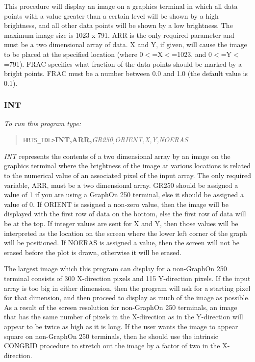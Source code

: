 This procedure will display an image on a graphics terminal in which all data
points with a value greater than a certain level will be shown by a high
brightness, and all other data points will be shown by a low brightness. The
maximum image size is 1023 x 791. ARR is the only required parameter and must
be a two dimensional array of data.  X and Y, if given, will cause the image to
be placed at the specified location (where 0$<$=X$<$=1023, and 0$<$=Y$<$=791). 
FRAC specifies what fraction of the data points should be marked by a bright
points.  FRAC must be a number between 0.0 and 1.0 (the default value is 0.1).  

\subsubsection{INT}

{\em To run this program type:}
\begin{quote}   
     {\tt HRTS\_IDL>}{\bf INT,ARR,}{\it GR250,ORIENT,X,Y,NOERAS}        
\end{quote}   

{\em INT} represents the contents of a two dimensional array by an image on the
graphics terminal where the brightness of the image at various locations is
related to the numerical value of an associated pixel of the input array.  The
only required variable, ARR, must be a two dimensional array.  GR250 should be
assigned a value of 1 if you are using a GraphOn 250 terminal, else it should
be assigned a value of 0. If ORIENT is assigned a non-zero value, then the
image will be displayed with the first row of data on the bottom, else the
first row of data will be at the top.  If integer values are sent for X and Y,
then those values will be interpreted as the location on the screen where the
lower left corner of the graph will be positioned.  If NOERAS is assigned a
value, then the screen will not be erased before the plot is drawn, otherwise
it will be erased.  

The largest image which this program can display for a non-GraphOn 250 terminal
consists of 300 X-direction pixels and 115 Y-direction pixels.  If the input
array is too big in either dimension, then the program will ask for a starting
pixel for that dimension, and then proceed to display as much of the image as
possible.  As a result of the screen resolution for non-GraphOn 250 terminals,
an image that has the same number of pixels in the X-direction as in the
Y-direction will appear to be twice as high as it is long.  If the user wants
the image to appear square on non-GraphOn 250 terminals, then he should use the
intrinsic CONGRID procedure to stretch out the image by a factor of two in the
X-direction.

